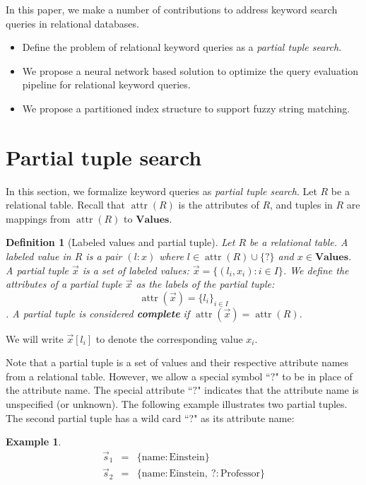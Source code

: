 \documentclass[conference]{IEEEtran}
\newtheorem{definition}{Definition}
\newtheorem{example}{Example}
\newcommand{\Attr}{\operatorname{attr}}
\newcommand{\Values}{\mathbf{Values}}
\begin{document}
In this paper, we make a number of contributions to address keyword search queries in relational databases.

\begin{itemize}
	\item Define the problem of relational keyword queries as a {\em partial tuple search}.
	\item We propose a neural network based solution to optimize the query evaluation pipeline for relational keyword queries.
	\item We propose a partitioned index structure to support fuzzy string matching.
\end{itemize}

\section{Partial tuple search}
In this section, we formalize keyword queries as {\em partial tuple search}.
Let $R$ be a relational table.  Recall that $\Attr(R)$ is the attributes of $R$, and tuples in $R$ are mappings from $\Attr(R)$ to $\Values$.

\begin{definition}[Labeled values and partial tuple]
Let $R$ be a relational table.  A labeled value in $R$ is a pair $(l:x)$ where 
$l\in\Attr(R)\cup\{?\}$ and $x\in\Values$.  A partial tuple $\vec{x}$ is a set
of labeled values: $\vec x = \{(l_i, x_i): i\in I\}$.  We define the
attributes of a partial tuple $\vec x$ as the labels of the partial
tuple:
$$\Attr(\vec x) = \{l_i\}_{i\in I}$$.
A partial tuple is considered {\bf\em complete} if $\Attr(\vec x) = \Attr(R)$.
\end{definition}

We will write $\vec x[l_i]$ to denote the corresponding value $x_i$.

Note that a partial tuple is a set of values and their respective attribute
names from a relational table.  However, we allow a special symbol ``$?$" to be
in place of the attribute name.  The special attribute ``$?$" indicates that
the attribute name is unspecified (or unknown). The following example
illustrates two partial tuples. The second partial tuple has a wild card ``?"
as its attribute name:

\begin{example}
\begin{eqnarray*}
\vec s_1 &=& \{\mathrm{name}:\mathrm{Einstein}\} \\
\vec s_2 &=& \{\mathrm{name}:\mathrm{Einstein},\ \mathrm{?}: \mathrm{Professor}\}
\end{eqnarray*}
\end{example}
\end{document}
